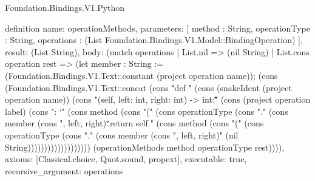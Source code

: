 \begin{lexlean}{Foundation.Bindings.V1.Python}
\begin{semanticmodule}
definition{
  name: operationMethods,
  parameters: [
    method : String,
    operationType : String,
    operations : (List Foundation.Bindings.V1.Model::BindingOperation)
  ],
  result: (List String),
  body: (match operations
    | List.nil => (nil String)
    | List.cons operation rest => (let member : String := (Foundation.Bindings.V1.Text::constant (project operation name)); (cons (Foundation.Bindings.V1.Text::concat (cons "\n    def " (cons (snakeIdent (project operation name)) (cons "(self, left: int, right: int) -> int:\n        \"\"\"" (cons (project operation label) (cons ": `" (cons method (cons "(" (cons operationType (cons "." (cons member (cons ", left, right)`.\"\"\"\n        return self." (cons method (cons "(" (cons operationType (cons "." (cons member (cons ", left, right)" (nil String))))))))))))))))))) (operationMethods method operationType rest)))),
  axioms: [Classical.choice, Quot.sound, propext],
  executable: true,
  recursive_argument: operations
}


\end{semanticmodule}
\end{lexlean}
